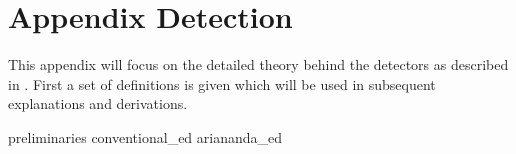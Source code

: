 \documentclass[a4paper, openany, oneside]{memoir}
\begin{document}
\section{Appendix Detection}
This appendix will focus on the detailed theory behind the detectors as described in . First a set of definitions is given which will be
used in subsequent explanations and derivations.

{preliminaries}
{conventional_ed}
{ariananda_ed}
\end{document}
